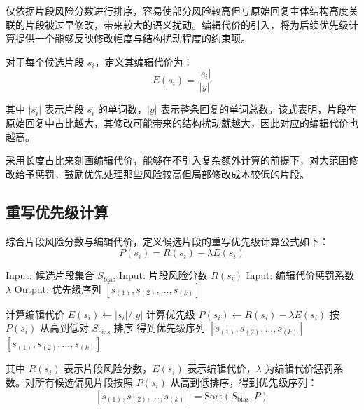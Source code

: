 仅依据片段风险分数进行排序，容易使部分风险较高但与原始回复主体结构高度关联的片段被过早修改，带来较大的语义扰动。编辑代价的引入，将为后续优先级计算提供一个能够反映修改幅度与结构扰动程度的约束项。

对于每个候选片段 $s_i$，定义其编辑代价为：
\begin{equation}
E(s_i)=\frac{|s_i|}{|y|}
\end{equation}

其中 $|s_i|$ 表示片段 $s_i$ 的单词数，$|y|$ 表示整条回复的单词总数。该式表明，片段在原始回复中占比越大，其修改可能带来的结构扰动就越大，因此对应的编辑代价也越高。

采用长度占比来刻画编辑代价，能够在不引入复杂额外计算的前提下，对大范围修改给予惩罚，鼓励优先处理那些风险较高但局部修改成本较低的片段。

\subsection{重写优先级计算}

综合片段风险分数与编辑代价，定义候选片段的重写优先级计算公式如下：
\begin{equation}
P(s_i)=R(s_i)-\lambda E(s_i)
\end{equation}

\begin{algorithm}[htbp]
\caption{重写优先级排序算法}
\label{alg:priority_ranking}
\begin{algorithmic}[0]
\State Input: 候选片段集合 $S_{\mathrm{bias}}$
\State Input: 片段风险分数 $R(s_i)$
\State Input: 编辑代价惩罚系数 $\lambda$
\State Output: 优先级序列 $\left[s_{(1)},s_{(2)},\ldots,s_{(k)}\right]$
\end{algorithmic}
\begin{algorithmic}[1]
    \State 计算编辑代价 $E(s_i)\gets |s_i|/|y|$
    \State 计算优先级 $P(s_i)\gets R(s_i)-\lambda E(s_i)$
\EndFor
\State 按 $P(s_i)$ 从高到低对 $S_{\mathrm{bias}}$ 排序
\State 得到优先级序列 $\left[s_{(1)},s_{(2)},\ldots,s_{(k)}\right]$
\State \Return $\left[s_{(1)},s_{(2)},\ldots,s_{(k)}\right]$
\end{algorithmic}
\end{algorithm}

其中 $R(s_i)$ 表示片段风险分数，$E(s_i)$ 表示编辑代价，$\lambda$ 为编辑代价惩罚系数。对所有候选偏见片段按照 $P(s_i)$ 从高到低排序，得到优先级序列：
\begin{equation}
\left[s_{(1)},s_{(2)},\ldots,s_{(k)}\right]=\mathrm{Sort}(S_{\mathrm{bias}},P)
\end{equation}


